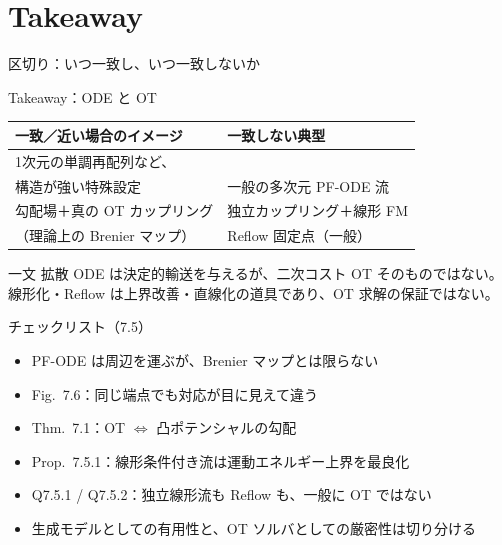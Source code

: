 \section{Takeaway}
\asmain
\begin{frame}{区切り：いつ一致し、いつ一致しないか}
    \tableofcontents[currentsection]
\end{frame}
\asmain
\begin{frame}{Takeaway：ODE と OT}
    \renewcommand{\arraystretch}{1.25}
    \begin{tabular}{p{}p{}}
        \textbf{一致／近い場合のイメージ} &
        \textbf{一致しない典型} \\
        \hline
        1次元の単調再配列など、\\
        構造が強い特殊設定 &
        一般の多次元 PF-ODE 流 \\
        勾配場＋真の OT カップリング &
        独立カップリング＋線形 FM \\
        （理論上の Brenier マップ） &
        Reflow 固定点（一般） \\
    \end{tabular}
    \vfill
    \begin{block}{一文}
        拡散 ODE は決定的輸送を与えるが、二次コスト OT そのものではない。\\
        線形化・Reflow は上界改善・直線化の道具であり、OT 求解の保証ではない。
    \end{block}
\end{frame}
\asmain
\begin{frame}{チェックリスト（7.5）}
    \begin{itemize}
        \item PF-ODE は周辺を運ぶが、Brenier マップとは限らない
        \item Fig.\ 7.6：同じ端点でも対応が目に見えて違う
        \item Thm.\ 7.1：OT $\Leftrightarrow$ 凸ポテンシャルの勾配
        \item Prop.\ 7.5.1：線形条件付き流は運動エネルギー上界を最良化
        \item Q7.5.1 / Q7.5.2：独立線形流も Reflow も、一般に OT ではない
        \item 生成モデルとしての有用性と、OT ソルバとしての厳密性は切り分ける
    \end{itemize}
\end{frame}

